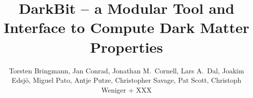 %
%
%
%
%
%
\RequirePackage{fix-cm}
%
\documentclass[twocolumn,epjc3]{svjour3}  
%
\smartqed  %
%
\RequirePackage{graphicx}
%
%
\RequirePackage{latexsym}
%
%
%


\title{DarkBit -- a Modular Tool and Interface to Compute Dark Matter Properties%
}


\author{Torsten Bringmann, Jan Conrad, Jonathan M.~Cornell, Lars A.~Dal, Joakim Edsj\"o, Miguel Pato, Antje Putze, Christopher Savage, Pat Scott, Christoph Weniger + XXX
}



